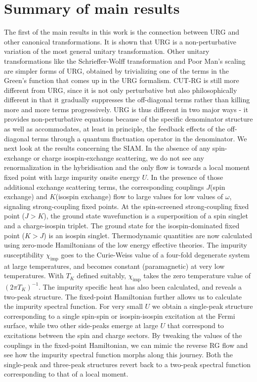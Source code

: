 \section{Summary of main results}
The first of the main results in this work is the connection between URG and other canonical transformations. It is shown that URG is a non-perturbative variation of the most general unitary transformation. Other unitary transformations like the Schrieffer-Wolff transformation and Poor Man's scaling are simpler forms of URG, obtained by trivializing one of the terms in the Green's function that comes up in the URG formalism. CUT-RG is still more different from URG, since it is not only perturbative but also philosophically different in that it gradually suppresses the off-diagonal terms rather than killing more and more terms progressively. URG is thus different in two major ways - it provides non-perturbative equations because of the specific denominator structure as well as accommodates, at least in principle, the feedback effects of the off-diagonal terms through a quantum fluctuation operator in the denominator.
We next look at the results concerning the SIAM. In the absence of any spin-exchange or charge isospin-exchange scattering, we do not see any renormalization in the hybridisation and the only flow is towards a local moment fixed point with large impurity onsite energy \(U\). In the presence of those additional exchange scattering terms, the corresponding couplings \(J\)(spin exchange) and \(K\)(isospin exchange) flow to large values for low values of \(\omega\), signaling strong-coupling fixed points.
At the spin-screened strong-coupling fixed point (\(J>K\)), the ground state wavefunction is a superposition of a spin singlet and a charge-isospin triplet. The ground state for the isospin-dominated fixed point (\(K>J\)) is an isospin singlet. Thermodynamic quantities are now calculated using zero-mode Hamiltonians of the low energy effective theories. The impurity susceptibility \(\chi_\text{imp}\) goes to the Curie-Weiss value of a four-fold degenerate system at large temperatures, and becomes constant (paramagnetic) at very low temperatures. With \(T_K\) defined suitably, \(\chi_\text{imp}\) takes the zero temperature value of \(\left( 2\pi T_K \right) ^{-1}\). The impurity specific heat has also been calculated, and reveals a two-peak structure.
The fixed-point Hamiltonian further allows us to calculate the impurity spectral function. For very small \(U\) we obtain a single-peak structure corresponding to a single spin-spin or isospin-isospin excitation at the Fermi surface, while two other side-peaks emerge at large \(U\) that correspond to excitations between the spin and charge sectors. By tweaking the values of the couplings in the fixed-point Hamiltonian, we can mimic the reverse RG flow and see how the impurity spectral function morphs along this journey. Both the single-peak and three-peak structures revert back to a two-peak spectral function corresponding to that of a local moment.
